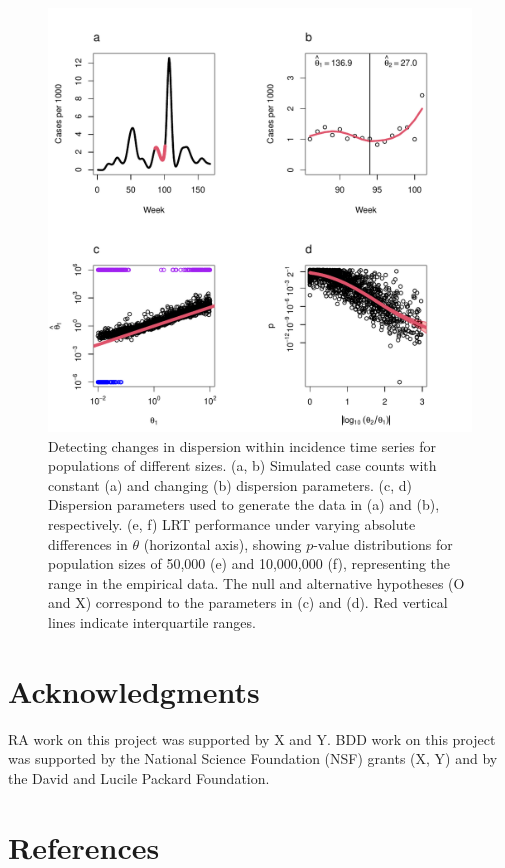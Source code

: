 \documentclass[11pt,letterpaper]{article}
\begin{document}
\begin{figure}[!ht]
\includegraphics[width=1\textwidth]{fig1}
\caption{
Detecting changes in dispersion within incidence time series for populations of different sizes. (a, b) Simulated case counts with constant (a) and changing (b) dispersion parameters. (c, d) Dispersion parameters used to generate the data in (a) and (b), respectively. (e, f) LRT performance under varying absolute differences in \(\theta\) (horizontal axis), showing \( p \)-value distributions for population sizes of 50,000 (e) and 10,000,000 (f), representing the range in the empirical data. The null and alternative hypotheses (O and X) correspond to the parameters in (c) and (d). Red vertical lines indicate interquartile ranges.
}\label{fig1}
\end{figure}



\section*{Acknowledgments}
RA work on this project was supported by X and Y. BDD work on this project was supported by the National Science Foundation (NSF) grants (X, Y) and by the David and Lucile Packard Foundation.

\section*{References}

\end{document}
